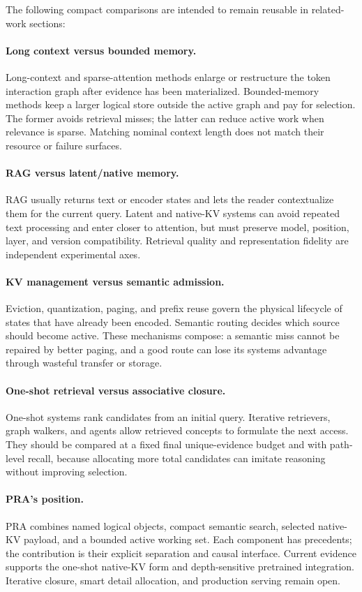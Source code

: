 \documentclass[10pt,a4paper]{article}
\begin{document}
The following compact comparisons are intended to remain reusable in related-work sections:

\paragraph{Long context versus bounded memory.}
Long-context and sparse-attention methods enlarge or restructure the token interaction graph
after evidence has been materialized. Bounded-memory methods keep a larger logical store
outside the active graph and pay for selection. The former avoids retrieval misses; the latter
can reduce active work when relevance is sparse. Matching nominal context length does not
match their resource or failure surfaces.

\paragraph{RAG versus latent/native memory.}
RAG usually returns text or encoder states and lets the reader contextualize them for the
current query. Latent and native-KV systems can avoid repeated text processing and enter closer
to attention, but must preserve model, position, layer, and version compatibility. Retrieval
quality and representation fidelity are independent experimental axes.

\paragraph{KV management versus semantic admission.}
Eviction, quantization, paging, and prefix reuse govern the physical lifecycle of states that
have already been encoded. Semantic routing decides which source should become active. These
mechanisms compose: a semantic miss cannot be repaired by better paging, and a good route can
lose its systems advantage through wasteful transfer or storage.

\paragraph{One-shot retrieval versus associative closure.}
One-shot systems rank candidates from an initial query. Iterative retrievers, graph walkers,
and agents allow retrieved concepts to formulate the next access. They should be compared at a
fixed final unique-evidence budget and with path-level recall, because allocating more total
candidates can imitate reasoning without improving selection.

\paragraph{PRA's position.}
PRA combines named logical objects, compact semantic search, selected native-KV payload, and a
bounded active working set. Each component has precedents; the contribution is their explicit
separation and causal interface. Current evidence supports the one-shot native-KV form and
depth-sensitive pretrained integration. Iterative closure, smart detail allocation, and
production serving remain open.
\end{document}
